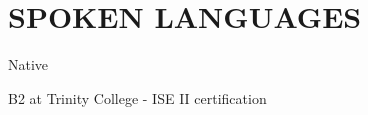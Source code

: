 \section{SPOKEN LANGUAGES}
\begin{description}[leftmargin=5mm]
    \item[-Italian:] Native
    \item[-English:] B2 at Trinity College - ISE II certification
\end{description}
